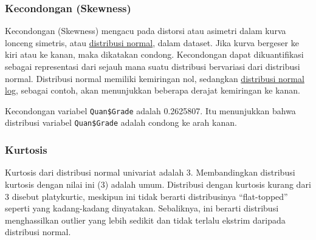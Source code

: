 \documentclass[
]{book}
\newenvironment{Shaded}{\begin{snugshade}}{\end{snugshade}}
\newcommand{\CommentTok}[1]{\textcolor[rgb]{0.56,0.35,0.01}{\textit{#1}}}
\newcommand{\FunctionTok}[1]{\textcolor[rgb]{0.13,0.29,0.53}{\textbf{#1}}}
\newcommand{\NormalTok}[1]{#1}
\newcommand{\SpecialCharTok}[1]{\textcolor[rgb]{0.81,0.36,0.00}{\textbf{#1}}}
\begin{document}
\hypertarget{kecondongan-skewness}{%
\subsubsection*{Kecondongan (Skewness)}\label{kecondongan-skewness}}

Kecondongan (Skewness) mengacu pada distorsi atau asimetri dalam kurva lonceng simetris, atau \href{https://www.investopedia.com/terms/n/normaldistribution.asp}{distribusi normal}, dalam dataset. Jika kurva bergeser ke kiri atau ke kanan, maka dikatakan condong. Kecondongan dapat dikuantifikasi sebagai representasi dari sejauh mana suatu distribusi bervariasi dari distribusi normal. Distribusi normal memiliki kemiringan nol, sedangkan \href{https://www.investopedia.com/articles/investing/102014/lognormal-and-normal-distribution.asp}{distribusi normal log}, sebagai contoh, akan menunjukkan beberapa derajat kemiringan ke kanan.

\begin{Shaded}
\end{Shaded}

Kecondongan variabel \texttt{Quan\$Grade} adalah 0.2625807. Itu menunjukkan bahwa distribusi variabel \texttt{Quan\$Grade} adalah condong ke arah kanan.

\hypertarget{kurtosis}{%
\subsubsection*{Kurtosis}\label{kurtosis}}

Kurtosis dari distribusi normal univariat adalah 3. Membandingkan distribusi kurtosis dengan nilai ini (3) adalah umum. Distribusi dengan kurtosis kurang dari 3 disebut platykurtic, meskipun ini tidak berarti distribusinya ``flat-topped'' seperti yang kadang-kadang dinyatakan. Sebaliknya, ini berarti distribusi menghassilkan outlier yang lebih sedikit dan tidak terlalu ekstrim daripada distribusi normal.

\begin{Shaded}
\end{Shaded}
\end{document}
